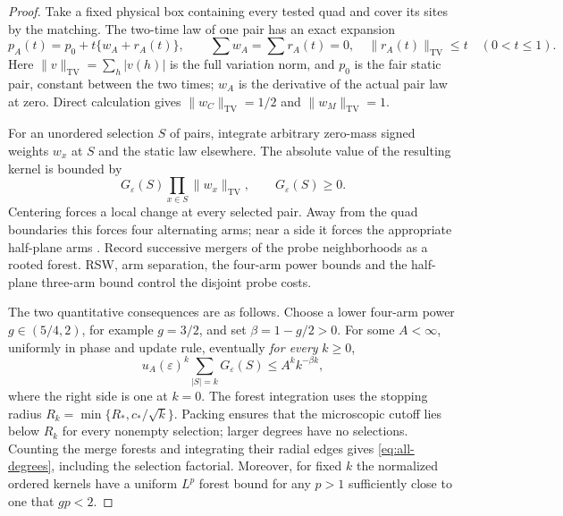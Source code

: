 \documentclass[11pt]{article}
\newcommand{\TV}{\mathrm{TV}}
\begin{document}
\begin{proof}
Take a fixed physical box containing every tested quad and cover its
sites by the matching. The two-time law of one pair has an exact
expansion
\[
 p_A(t)=p_0+t\{w_A+r_A(t)\},\qquad
 \sum w_A=\sum r_A(t)=0,\quad
 \|r_A(t)\|_\TV\leq t\quad(0<t\leq1).
\]
Here $\|v\|_\TV=\sum_h|v(h)|$ is the full variation norm, and
$p_0$ is the fair static pair, constant between the two times;
$w_A$ is the derivative of the actual pair law at zero. Direct
calculation gives $\|w_C\|_\TV=1/2$ and $\|w_M\|_\TV=1$.

For an unordered selection $S$ of pairs, integrate arbitrary zero-mass
signed weights $w_x$ at $S$ and the static law elsewhere. The absolute
value of the resulting kernel is bounded by
\begin{equation}\label{eq:geometry}
          G_\varepsilon(S)\prod_{x\in S}\|w_x\|_\TV,
          \qquad G_\varepsilon(S)\geq0.
\end{equation}
Centering forces a local change at every selected pair. Away from the
quad boundaries this forces four alternating arms; near a side it
forces the appropriate half-plane arms \cite[Lemma 2.2]{OAI}.
Record successive mergers of the probe neighborhoods as a rooted
forest. RSW, arm separation, the four-arm power bounds and the
half-plane three-arm bound \cite[Theorems 20 and 23(ii)]{Nolin}
control the disjoint probe costs.

The two quantitative consequences are as follows. Choose a lower
four-arm power $g\in(5/4,2)$, for example $g=3/2$, and set
$\beta=1-g/2>0$.
For some $A<\infty$, uniformly in phase and update rule, eventually
\emph{for every} $k\geq0$,
\begin{equation}\label{eq:all-degrees}
 u_A(\varepsilon)^k\sum_{|S|=k}G_\varepsilon(S)
       \leq A^k k^{-\beta k},
\end{equation}
where the right side is one at $k=0$. The forest integration uses
the stopping radius $R_k=\min\{R_*,c_*/\sqrt{k}\}$.
Packing ensures that the microscopic cutoff lies below $R_k$ for
every nonempty selection; larger degrees have no selections. Counting
the merge forests and integrating their radial edges gives
\eqref{eq:all-degrees}, including the selection factorial.
Moreover, for fixed $k$ the normalized ordered kernels have a uniform
$L^p$ forest bound for any $p>1$ sufficiently close to one that $gp<2$.


\end{proof}
\end{document}
